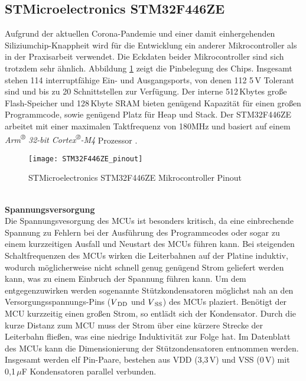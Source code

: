 
\subsection{STMicroelectronics STM32F446ZE}
\label{sec:STM}
Aufgrund der aktuellen Corona-Pandemie und einer damit einhergehenden Siliziumchip-Knappheit wird für die Entwicklung ein anderer Mikrocontroller als in der Praxisarbeit verwendet. Die Eckdaten beider Mikrocontroller sind sich trotzdem sehr ähnlich. Abbildung \ref{fig:MCU_pinout} zeigt die Pinbelegung des Chips. Insgesamt stehen 114 interruptfähige Ein- und Ausgangsports, von denen 112 5\,V Tolerant sind und bis zu 20 Schnittstellen zur Verfügung. Der interne 512\,Kbytes große Flash-Speicher und 128\,Kbyte SRAM bieten genügend Kapazität für einen großen Programmcode, sowie genügend Platz für Heap und Stack. Der STM32F446ZE arbeitet mit einer maximalen Taktfrequenz von 180MHz und basiert auf einem \textit{Arm\textsuperscript{®} 32-bit Cortex\textsuperscript{®}-M4} Prozessor \cite[S. 1]{STM32F446ZE_Datasheet}.
\begin{figure}[!htb]
	\begin{center}
		\texttt{[image: STM32F446ZE\_pinout]}
		\caption{STMicroelectronics STM32F446ZE Mikrocontroller Pinout \cite[S. 41]{STM32F446ZE_Datasheet}}
		\label{fig:MCU_pinout}
	\end{center}
\end{figure}\\
\newline
\hspace{-5mm}\textbf{Spannungsversorgung}\\
Die Spannungsvesorgung des MCUs ist besonders kritisch, da eine einbrechende Spannung zu Fehlern bei der Ausführung des Programmcodes oder sogar zu einem kurzzeitigen Ausfall und Neustart des MCUs führen kann. Bei steigenden Schaltfrequenzen des MCUs wirken die Leiterbahnen auf der Platine induktiv, wodurch möglicherweise nicht schnell genug genügend Strom geliefert werden kann, was zu einem Einbruch der Spannung führen kann. Um dem entgegenzuwirken werden sogenannte Stützkondensatoren möglichst nah an den Versorgungsspannungs-Pins ($V\textsubscript{DD}$ und $V\textsubscript{SS}$) des MCUs plaziert. Benötigt der MCU kurzzeitig einen großen Strom, so entlädt sich der Kondensator. Durch die kurze Distanz zum MCU muss der Strom über eine kürzere Strecke der Leiterbahn fließen, was eine niedrige Induktivität zur Folge hat. Im Datenblatt \cite{F446RM} des MCUs kann die Dimensionierung der Stützondensatoren entnommen werden. Insgesamt werden elf Pin-Paare, bestehen aus VDD (3,3\,V) und VSS (0\,V) mit 0,1\,$\mu$F Kondensatoren parallel verbunden.\\
